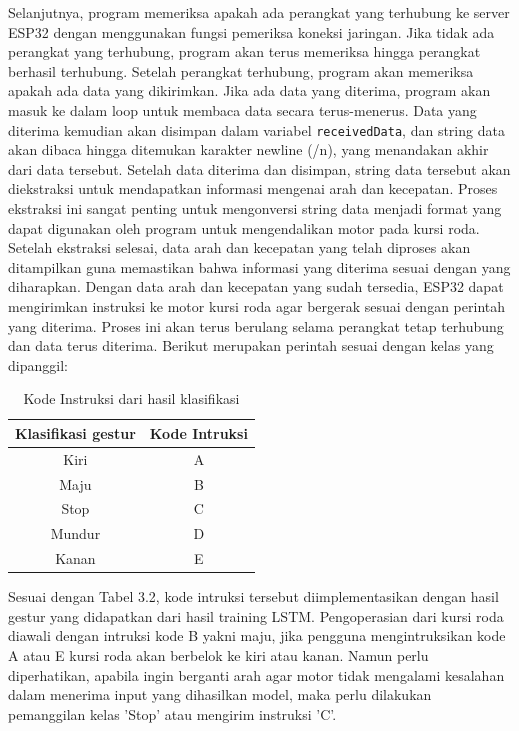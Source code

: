 Selanjutnya, program memeriksa apakah ada perangkat yang terhubung ke server ESP32 dengan menggunakan fungsi pemeriksa koneksi jaringan. Jika tidak ada perangkat yang terhubung, program akan terus memeriksa hingga perangkat berhasil terhubung. Setelah perangkat terhubung, program akan memeriksa apakah ada data yang dikirimkan. Jika ada data yang diterima, program akan masuk ke dalam loop untuk membaca data secara terus-menerus. Data yang diterima kemudian akan disimpan dalam variabel \texttt{receivedData}, dan string data akan dibaca hingga ditemukan karakter newline (/n), yang menandakan akhir dari data tersebut.
Setelah data diterima dan disimpan, string data tersebut akan diekstraksi untuk mendapatkan informasi mengenai arah dan kecepatan. Proses ekstraksi ini sangat penting untuk mengonversi string data menjadi format yang dapat digunakan oleh program untuk mengendalikan motor pada kursi roda. Setelah ekstraksi selesai, data arah dan kecepatan yang telah diproses akan ditampilkan guna memastikan bahwa informasi yang diterima sesuai dengan yang diharapkan. Dengan data arah dan kecepatan yang sudah tersedia, ESP32 dapat mengirimkan instruksi ke motor kursi roda agar bergerak sesuai dengan perintah yang diterima. Proses ini akan terus berulang selama perangkat tetap terhubung dan data terus diterima. Berikut merupakan perintah sesuai dengan kelas yang dipanggil:

\begin{table}[H]
    \centering
    \begin{tabular}{|c|c|}
    \hline
    \textbf{Klasifikasi gestur} & \textbf{Kode Intruksi} \\ \hline
    Kiri & A \\ \hline
    Maju & B \\ \hline
    Stop & C \\ \hline
    Mundur & D \\ \hline
    Kanan & E \\ \hline
    \end{tabular}
    \caption{Kode Instruksi dari hasil klasifikasi}
    \label{tab:kode intruksi}
\end{table}

Sesuai dengan Tabel 3.2, kode intruksi tersebut diimplementasikan dengan hasil gestur yang didapatkan dari hasil training LSTM. Pengoperasian dari kursi roda diawali dengan intruksi kode B yakni maju, jika pengguna mengintruksikan kode A atau E kursi roda akan berbelok ke kiri atau kanan. Namun perlu diperhatikan, apabila ingin berganti arah agar motor tidak mengalami kesalahan dalam menerima input yang dihasilkan model, maka perlu dilakukan pemanggilan kelas ’Stop’ atau mengirim instruksi ’C’.

